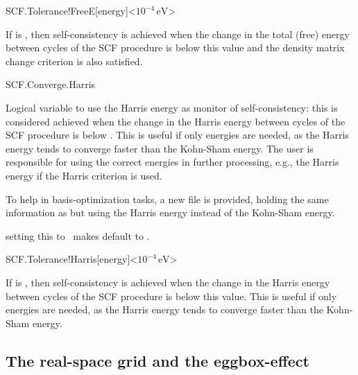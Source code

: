 \begin{fdfentry}{SCF.Tolerance!FreeE}[energy]<$10^{-4}\,\mathrm{eV}$>

  If  is \fdftrue, then self-consistency is
  achieved when the change in the total (free) energy between cycles
  of the SCF procedure is below this value and the density matrix
  change criterion is also satisfied.

\end{fdfentry}

\begin{fdflogicalF}{SCF.Converge.Harris}

  Logical variable to use the Harris energy as monitor of
  self-consistency: this is considered achieved when the change in the
  Harris energy between cycles of the SCF procedure is below
  . This is useful if only
  energies are needed, as the Harris energy tends to converge faster
  than the Kohn-Sham energy. The user is responsible for using the
  correct energies in further processing, e.g., the Harris energy if
  the Harris criterion is used.

  To help in basis-optimization tasks, a new file
   is provided, holding the same
  information as  but using the Harris energy
  instead of the Kohn-Sham energy.

  \note setting this to \fdftrue\ makes 
   default to \fdffalse.

\end{fdflogicalF}

\begin{fdfentry}{SCF.Tolerance!Harris}[energy]<$10^{-4}\,\mathrm{eV}$>

  If  is \fdftrue, then self-consistency is
  achieved when the change in the Harris energy between cycles of the
  SCF procedure is below this value. This is useful if only energies
  are needed, as the Harris energy tends to converge faster than the
  Kohn-Sham energy.
  
\end{fdfentry}



\vspace{5pt}
\subsection{The real-space grid and the eggbox-effect}

